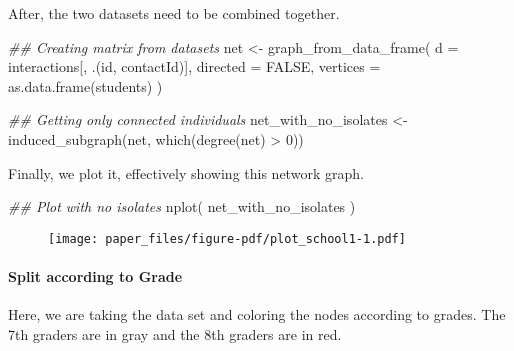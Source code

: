 \documentclass[
]{apa7}
\let\oldparagraph\paragraph
\renewcommand{\paragraph}[1]{\oldparagraph{#1}\mbox{}}
\newenvironment{Shaded}{\begin{snugshade}}{\end{snugshade}}
\newcommand{\AttributeTok}[1]{\textcolor[rgb]{0.40,0.45,0.13}{#1}}
\newcommand{\ConstantTok}[1]{\textcolor[rgb]{0.56,0.35,0.01}{#1}}
\newcommand{\DecValTok}[1]{\textcolor[rgb]{0.68,0.00,0.00}{#1}}
\newcommand{\DocumentationTok}[1]{\textcolor[rgb]{0.37,0.37,0.37}{\textit{#1}}}
\newcommand{\FunctionTok}[1]{\textcolor[rgb]{0.28,0.35,0.67}{#1}}
\newcommand{\NormalTok}[1]{\textcolor[rgb]{0.00,0.23,0.31}{#1}}
\newcommand{\OtherTok}[1]{\textcolor[rgb]{0.00,0.23,0.31}{#1}}
\newcommand{\SpecialCharTok}[1]{\textcolor[rgb]{0.37,0.37,0.37}{#1}}
\begin{document}
After, the two datasets need to be combined together.

\begin{Shaded}
\begin{Highlighting}[]
\DocumentationTok{\#\# Creating matrix from datasets}
\NormalTok{net }\OtherTok{\textless{}{-}} \FunctionTok{graph\_from\_data\_frame}\NormalTok{(}
  \AttributeTok{d =}\NormalTok{ interactions[, .(id, contactId)],}
  \AttributeTok{directed =} \ConstantTok{FALSE}\NormalTok{, }\AttributeTok{vertices =} \FunctionTok{as.data.frame}\NormalTok{(students)}
\NormalTok{)}

\DocumentationTok{\#\# Getting only connected individuals}
\NormalTok{net\_with\_no\_isolates }\OtherTok{\textless{}{-}} \FunctionTok{induced\_subgraph}\NormalTok{(net, }\FunctionTok{which}\NormalTok{(}\FunctionTok{degree}\NormalTok{(net) }\SpecialCharTok{\textgreater{}} \DecValTok{0}\NormalTok{))}
\end{Highlighting}
\end{Shaded}

Finally, we plot it, effectively showing this network graph.

\begin{Shaded}
\begin{Highlighting}[]
\DocumentationTok{\#\# Plot with no isolates}
\FunctionTok{nplot}\NormalTok{(}
\NormalTok{  net\_with\_no\_isolates}
\NormalTok{) }
\end{Highlighting}
\end{Shaded}

\begin{figure}[H]

{\centering \texttt{[image: paper\_files/figure-pdf/plot\_school1-1.pdf]}

}

\end{figure}

\hypertarget{split-according-to-grade}{%
\paragraph{Split according to Grade}\label{split-according-to-grade}}

Here, we are taking the data set and coloring the nodes according to
grades. The 7th graders are in gray and the 8th graders are in red.
\end{document}
